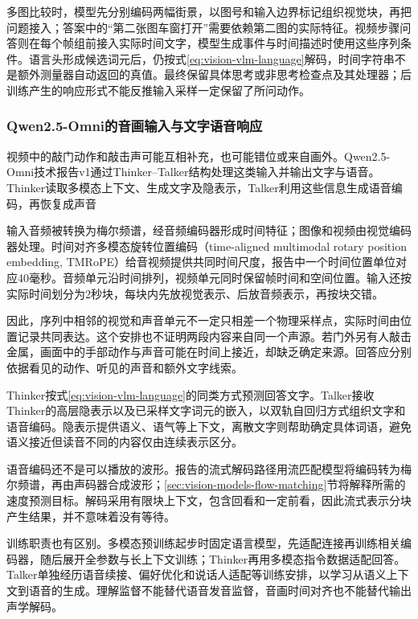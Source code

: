 多图比较时，模型先分别编码两幅街景，以图号和输入边界标记组织视觉块，再把问题接入；答案中的“第二张图车窗打开”需要依赖第二图的实际特征。视频步骤问答则在每个帧组前接入实际时间文字，模型生成事件与时间描述时使用这些序列条件。语言头形成候选词元后，仍按式\eqref{eq:vision-vlm-language}解码，时间字符串不是额外测量器自动返回的真值。最终保留具体思考或非思考检查点及其处理器；后训练产生的响应形式不能反推输入采样一定保留了所问动作。

\subsubsection{Qwen2.5-Omni的音画输入与文字语音响应}
\label{sec:vision-models-qwen-omni}

视频中的敲门动作和敲击声可能互相补充，也可能错位或来自画外。Qwen2.5-Omni技术报告v1通过Thinker--Talker结构处理这类输入并输出文字与语音。Thinker读取多模态上下文、生成文字及隐表示，Talker利用这些信息生成语音编码，再恢复成声音

输入音频被转换为梅尔频谱，经音频编码器形成时间特征；图像和视频由视觉编码器处理。时间对齐多模态旋转位置编码（time-aligned multimodal rotary position embedding, TMRoPE）给音视频提供共同时间尺度，报告中一个时间位置单位对应40毫秒。音频单元沿时间排列，视频单元同时保留帧时间和空间位置。输入还按实际时间划分为2秒块，每块内先放视觉表示、后放音频表示，再按块交错。

因此，序列中相邻的视觉和声音单元不一定只相差一个物理采样点，实际时间由位置记录共同表达。这个安排也不证明两段内容来自同一个声源。若门外另有人敲击金属，画面中的手部动作与声音可能在时间上接近，却缺乏确定来源。回答应分别依据看见的动作、听见的声音和额外文字线索。

Thinker按式\eqref{eq:vision-vlm-language}的同类方式预测回答文字。Talker接收Thinker的高层隐表示以及已采样文字词元的嵌入，以双轨自回归方式组织文字和语音编码。隐表示提供语义、语气等上下文，离散文字则帮助确定具体词语，避免语义接近但读音不同的内容仅由连续表示区分。

语音编码还不是可以播放的波形。报告的流式解码路径用流匹配模型将编码转为梅尔频谱，再由声码器合成波形；\ref{sec:vision-models-flow-matching}节将解释所需的速度预测目标。解码采用有限块上下文，包含回看和一定前看，因此流式表示分块产生结果，并不意味着没有等待。

训练职责也有区别。多模态预训练起步时固定语言模型，先适配连接再训练相关编码器，随后展开全参数与长上下文训练；Thinker再用多模态指令数据适配回答。Talker单独经历语音续接、偏好优化和说话人适配等训练安排，以学习从语义上下文到语音的生成。理解监督不能替代语音发音监督，音画时间对齐也不能替代输出声学解码。

